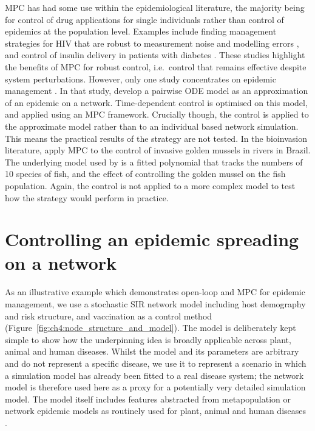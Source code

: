 MPC has had some use within the epidemiological literature, the majority being for control of drug applications for single individuals rather than control of epidemics at the population level. Examples include finding management strategies for HIV that are robust to measurement noise and modelling errors \citep{zurakowski_model_2006, david_receding_2011}, and control of insulin delivery in patients with diabetes \citep{hovorka_nonlinear_2004}. These studies highlight the benefits of MPC for robust control, i.e.\ control that remains effective despite system perturbations. However, only one study concentrates on epidemic management \citep{selley_dynamic_2015}. In that study, \citeauthor{selley_dynamic_2015} develop a pairwise ODE model as an approximation of an epidemic on a network. Time-dependent control is optimised on this model, and applied using an MPC framework. Crucially though, the control is applied to the approximate model rather than to an individual based network simulation. This means the practical results of the strategy are not tested. In the bioinvasion literature, \citet{de_model_2019} apply MPC to the control of invasive golden mussels in rivers in Brazil. The underlying model used by \citet{de_model_2019} is a fitted polynomial that tracks the numbers of 10 species of fish, and the effect of controlling the golden mussel on the fish population. Again, the control is not applied to a more complex model to test how the strategy would perform in practice.

\section{Controlling an epidemic spreading on a network\label{sec:ch4:Controlling}}

As an illustrative example which demonstrates open-loop and MPC for epidemic management, we use a stochastic SIR network model including host demography and risk structure, and vaccination as a control method (Figure~\ref{fig:ch4:node_structure_and_model}). The model is deliberately kept simple to show how the underpinning idea is broadly applicable across plant, animal and human diseases. Whilst the model and its parameters are arbitrary and do not represent a specific disease, we use it to represent a scenario in which a simulation model has already been fitted to a real disease system; the network model is therefore used here as a proxy for a potentially very detailed simulation model. The model itself includes features abstracted from metapopulation or network epidemic models as routinely used for plant, animal and human diseases \citep[e.g.][]{rowthorn_optimal_2009, keeling_dynamics_2001, keeling_metapopulation_2000, margosian_connectivity_2009, bansal_individual_2007}.

